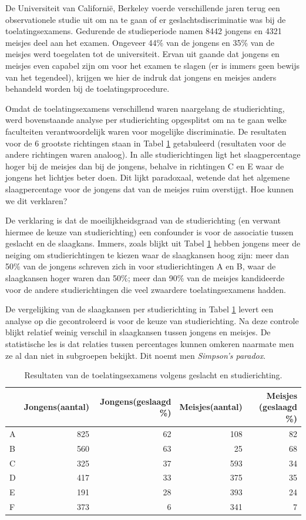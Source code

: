 \documentclass[
  12pt,dutch]{book}
\theoremstyle{definition}
\theoremstyle{definition}
\theoremstyle{definition}
\theoremstyle{definition}
\theoremstyle{remark}
\begin{document}
De Universiteit van
Californië, Berkeley voerde verschillende jaren terug een observationele
studie uit om na te gaan of er geslachtsdiscriminatie was bij de
toelatingsexamens. Gedurende de studieperiode namen 8442 jongens en 4321
meisjes deel aan het examen. Ongeveer 44\% van de jongens en 35\% van de
meisjes werd toegelaten tot de universiteit. Ervan uit gaande dat jongens en
meisjes even capabel zijn om voor het examen te slagen (er is immers geen
bewijs van het tegendeel), krijgen we hier de indruk dat jongens en meisjes
anders behandeld worden bij de toelatingsprocedure.

Omdat de toelatingsexamens verschillend waren naargelang de studierichting,
werd bovenstaande analyse per studierichting opgesplitst om na te gaan welke
faculteiten verantwoordelijk waren voor mogelijke discriminatie. De
resultaten voor de 6 grootste richtingen staan in Tabel \ref{tab:sexbias}
getabuleerd (resultaten voor de andere richtingen waren analoog). In alle
studierichtingen ligt het slaagpercentage hoger bij de meisjes dan bij de
jongens, behalve in richtingen C en E waar de jongens het lichtjes beter doen. Dit
lijkt paradoxaal, wetende dat het algemene slaagpercentage voor de jongens
dat van de meisjes ruim overstijgt. Hoe kunnen we dit verklaren?

De verklaring is dat de moeilijkheidsgraad van de studierichting (en verwant
hiermee de keuze van studierichting) een confounder is voor de associatie
tussen geslacht en de slaagkans. Immers, zoals blijkt uit Tabel \ref{tab:sexbias} hebben jongens meer de neiging om studierichtingen te kiezen
waar de slaagkansen hoog zijn: meer dan 50\% van de jongens schreven zich in
voor studierichtingen A en B, waar de slaagkansen hoger waren dan 50\%; meer
dan 90\% van de meisjes kandideerde voor de andere studierichtingen die veel
zwaardere toelatingsexamens hadden.

De vergelijking van de slaagkansen per studierichting in Tabel \ref{tab:sexbias}
levert een analyse op die gecontroleerd is voor de keuze van
studierichting. Na deze controle blijkt relatief weinig verschil in
slaagkansen tussen jongens en meisjes. De statistische les is dat relaties
tussen percentages kunnen omkeren naarmate men ze al dan niet in subgroepen
bekijkt. Dit noemt men \emph{Simpson's paradox}.

\begin{table}

\caption{\label{tab:sexbias}Resultaten van de toelatingsexamens volgens geslacht en studierichting.}
\centering
\begin{tabular}[t]{lrrrr}
\toprule
  & Jongens(aantal) & Jongens(geslaagd \%) & Meisjes(aantal) & Meisjes (geslaagd \%)\\
\midrule
A & 825 & 62 & 108 & 82\\
B & 560 & 63 & 25 & 68\\
C & 325 & 37 & 593 & 34\\
D & 417 & 33 & 375 & 35\\
E & 191 & 28 & 393 & 24\\
\addlinespace
F & 373 & 6 & 341 & 7\\
\bottomrule
\end{tabular}
\end{table}
\end{document}
